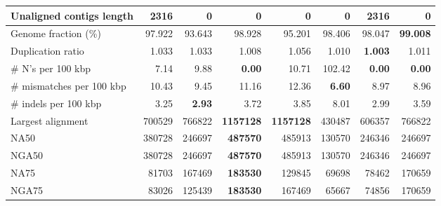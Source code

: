 \documentclass[12pt,a4paper]{article}
\begin{document}
\begin{table}[ht]
\begin{center}
\begin{tabular}{|l*{7}{|r}|}
Unaligned contigs length & 2316 & {\bf 0} & {\bf 0} & {\bf 0} & {\bf 0} & 2316 & {\bf 0} \\ \hline
Genome fraction (\%) & 97.922 & 93.643 & 98.928 & 95.201 & 98.406 & 98.047 & {\bf 99.008} \\ \hline
Duplication ratio & 1.033 & 1.033 & 1.008 & 1.056 & 1.010 & {\bf 1.003} & 1.011 \\ \hline
\# N's per 100 kbp & 7.14 & 9.88 & {\bf 0.00} & 10.71 & 102.42 & {\bf 0.00} & {\bf 0.00} \\ \hline
\# mismatches per 100 kbp & 10.43 & 9.45 & 11.16 & 12.36 & {\bf 6.60} & 8.97 & 8.96 \\ \hline
\# indels per 100 kbp & 3.25 & {\bf 2.93} & 3.72 & 3.85 & 8.01 & 2.99 & 3.59 \\ \hline
Largest alignment & 700529 & 766822 & {\bf 1157128} & {\bf 1157128} & 430487 & 606357 & 766822 \\ \hline
NA50 & 380728 & 246697 & {\bf 487570} & 485913 & 130570 & 246346 & 246697 \\ \hline
NGA50 & 380728 & 246697 & {\bf 487570} & 485913 & 130570 & 246346 & 246697 \\ \hline
NA75 & 81703 & 167469 & {\bf 183530} & 129845 & 69698 & 78462 & 170659 \\ \hline
NGA75 & 83026 & 125439 & {\bf 183530} & 167469 & 65667 & 74856 & 170659 \\ \hline
\end{tabular}
\end{center}
\end{table}
\end{document}
